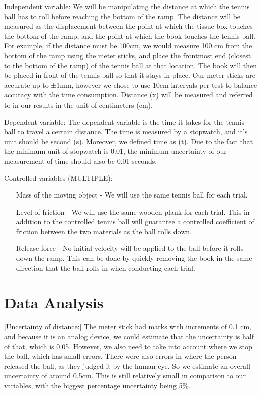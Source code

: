 \documentclass[12pt]{report}
\begin{document}
Independent variable:
We will be manipulating the distance at which the tennis ball has to roll before reaching the bottom of the ramp. The distance will be measured as the displacement between the point at which the tissue box touches the bottom of the ramp, and the point at which the book touches the tennis ball. For example, if the distance must be 100cm, we would measure 100 cm from the bottom of the ramp using the meter sticks, and place the frontmost end (closest to the bottom of the ramp) of the tennis ball at that location. The book will then be placed in front of the tennis ball so that it stays in place. Our meter sticks are accurate up to ±1mm, however we chose to use 10cm intervals per test to balance accuracy with the time consumption. Distance (x) will be measured and referred to in our results in the unit of centimeters (cm).

Dependent variable:
The dependent variable is the time it takes for the tennis ball to travel a certain distance. The time is measured by a stopwatch, and it’s unit should be second (s). Moreover, we defined time as (t). Due to the fact that the minimum unit of stopwatch is 0.01, the minimum uncertainty of our measurement of time should also be 0.01 seconds.

Controlled variables (MULTIPLE):
\begin{enumerate}
    \item [Mass of the moving object] - We will use the same tennis ball for each trial.
    \item [Level of friction] - We will use the same wooden plank for each trial. This in addition to the controlled tennis ball will guarantee a controlled coefficient of friction between the two materials as the ball rolls down.
    \item [Release force] - No initial velocity will be applied to the ball before it rolls down the ramp. This can be done by quickly removing the book in the same direction that the ball rolls in when conducting each trial.
\end{enumerate}
\section{Data Analysis}
 [Uncertainty of distance:] The meter stick had marks with increments of 0.1 cm, and because it is an analog device, we could estimate that the uncertainty is half of that, which is 0.05. However, we also need to take into account where we stop the ball, which has small errors. There were also errors in where the person released the ball, as they judged it by the human eye. So we estimate an overall uncertainty of around 0.5cm. This is still relatively small in comparison to our variables, with the biggest percentage uncertainty being 5\%.
\end{document}
